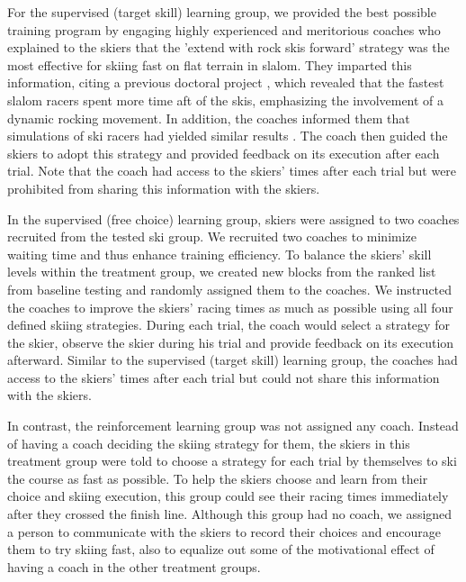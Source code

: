 \documentclass[pdflatex,sn-mathphys-num]{sn-jnl}%
\theoremstyle{thmstyleone}%
\theoremstyle{thmstyletwo}%
\theoremstyle{thmstylethree}%
\begin{document}
For the supervised (target skill) learning group, we provided the best possible training program by engaging highly experienced and meritorious coaches who explained to the skiers that the 'extend with rock skis forward' strategy was the most effective for skiing fast on flat terrain in slalom. They imparted this information, citing a previous doctoral project \cite{reid_kinematic_2010}, which revealed that the fastest slalom racers spent more time aft of the skis, emphasizing the involvement of a dynamic rocking movement. In addition, the coaches informed them that simulations of ski racers had yielded similar results \cite{mote_accelerations_1983, lind_physics_2013}. The coach then guided the skiers to adopt this strategy and provided feedback on its execution after each trial. Note that the coach had access to the skiers' times after each trial but were prohibited from sharing this information with the skiers.

In the supervised (free choice) learning group, skiers were assigned to two coaches recruited from the tested ski group. We recruited two coaches to minimize waiting time and thus enhance training efficiency. To balance the skiers' skill levels within the treatment group, we created new blocks from the ranked list from baseline testing and randomly assigned them to the coaches. We instructed the coaches to improve the skiers' racing times as much as possible using all four defined skiing strategies. During each trial, the coach would select a strategy for the skier, observe the skier during his trial and provide feedback on its execution afterward. Similar to the supervised (target skill) learning group, the coaches had access to the skiers' times after each trial but could not share this information with the skiers.

In contrast, the reinforcement learning group was not assigned any coach. Instead of having a coach deciding the skiing strategy for them, the skiers in this treatment group were told to choose a strategy for each trial by themselves to ski the course as fast as possible. To help the skiers choose and learn from their choice and skiing execution, this group could see their racing times immediately after they crossed the finish line. Although this group had no coach, we assigned a person to communicate with the skiers to record their choices and encourage them to try skiing fast, also to equalize out some of the motivational effect of having a coach in the other treatment groups. 
\end{document}
